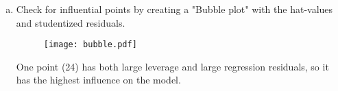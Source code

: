 \documentclass[12pt,letterpaper]{article}
\begin{document}
\begin{enumerate}[(a)]
	\item Check for influential points by creating a "Bubble plot" with the hat-values and studentized residuals.
	   
	
	\begin{figure}[h!]\centering
		\caption{\footnotesize }
		\label{fig:plot_e}
		\texttt{[image: bubble.pdf]}
		\end{figure}
		
	One point (24) has both large leverage and large regression residuals, so it has the highest influence on the model.

	
\end{enumerate}
\end{document}
